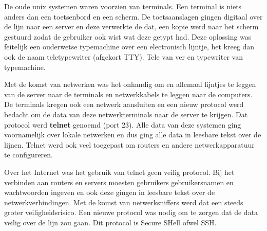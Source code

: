 De oude unix systemen waren voorzien van terminals. Een terminal is niets anders dan een toetsenbord en een scherm. De toetsaanslagen gingen digitaal over de lijn naar een server en deze verwerkte de dat, een kopie werd naar het scherm gestuurd zodat de gebruiker ook wist wat deze getypt had. Deze oplossing was feitelijk een ouderwetse typemachine over een electronisch lijntje, het kreeg dan ook de naam teletypewriter (afgekort TTY). Tele van ver en typewriter van typemachine.

Met de komst van netwerken was het onhandig om en allemaal lijntjes te leggen van de server naar de terminals en netwerkkabels te leggen naar de computers. De terminals kregen ook een netwerk aansluiten en een nieuw protocol werd bedacht om de data van deze netwerkterminals naar de server te krijgen. Dat protocol werd \textbf{telnet} genoemd (port 23). Alle data van deze systemen ging voornamelijk over lokale netwerken en dus ging alle data in leesbare tekst over de lijnen. Telnet werd ook veel toegepast om routers en andere netwerkapparatuur te configureren.

Over het Internet was het gebruik van telnet geen veilig protocol. Bij het verbinden aan routers en servers moesten gebruikers gebruikersnamen en wachtwoorden ingeven en ook deze gingen in leesbare tekst over de netwerkverbindingen. Met de komst van netwerksniffers werd dat een steeds groter veiligheidsrisico. Een nieuwe protocol was nodig om te zorgen dat de data veilig over de lijn zou gaan. Dit protocol is Secure SHell ofwel SSH.

